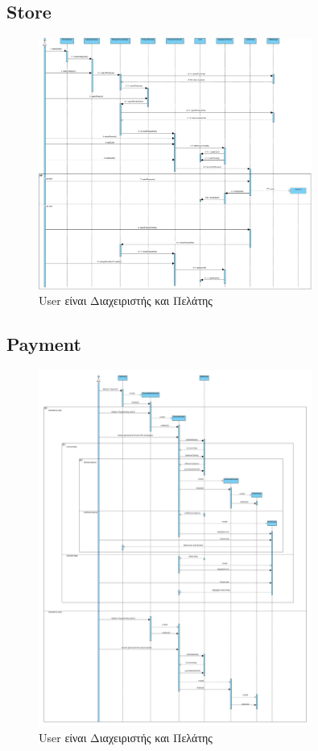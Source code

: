 \documentclass[12pt,a4paper,twoside]{book}
\begin{document}
\subsection{Store}
\begin{figure}[H]
    \centering
    \includegraphics[width=0.8\textwidth]{Resources/Sequence Diagram/Store_sd.png}
    \caption{User είναι Διαχειριστής και Πελάτης}\label{fig:sequence-store}
\end{figure}

\subsection{Payment}
\begin{figure}[H]
    \centering
    \includegraphics[width=0.8\textwidth]{Resources/Sequence Diagram/Payment_SD.jpg}
    \caption{User είναι Διαχειριστής και Πελάτης}\label{fig:sequence-payment}
\end{figure}
\end{document}
